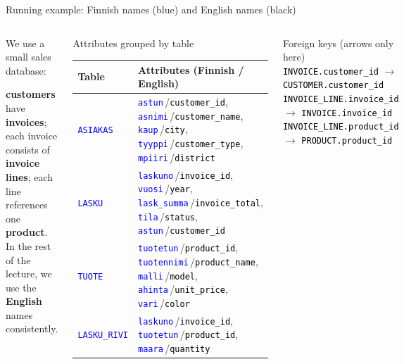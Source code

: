 \documentclass[10pt,aspectratio=169]{beamer}
\newcommand{\fin}[1]{\textcolor{blue}{\texttt{#1}}}
\newcommand{\eng}[1]{\textcolor{black}{\texttt{#1}}}
\begin{document}
\begin{frame}{Running example: Finnish names (blue) and English names (black)}
\small
\begin{columns}[T,onlytextwidth]


\begin{block}{We use a small sales database:}

\textbf{customers} have \textbf{invoices}; each invoice consists of \textbf{invoice lines}; each line references one \textbf{product}.\\
In the rest of the lecture, we use the \textbf{English} names consistently.
\end{block}

\vspace{5mm}
\begin{block}{Attributes grouped by table}
\scriptsize
\begin{tabular}{@{}l l@{}}
\toprule
\textbf{Table} & \textbf{Attributes (Finnish / English)}\\
\midrule
\fin{ASIAKAS} &
\fin{astun}\,/\eng{customer\_id},\;
\fin{asnimi}\,/\eng{customer\_name},\;
\fin{kaup}\,/\eng{city},\;
\fin{tyyppi}\,/\eng{customer\_type},\;
\fin{mpiiri}\,/\eng{district}\\
\addlinespace
\fin{LASKU} &
\fin{laskuno}\,/\eng{invoice\_id},\;
\fin{vuosi}\,/\eng{year},\;
\fin{lask\_summa}\,/\eng{invoice\_total},\;
\fin{tila}\,/\eng{status},\;
\fin{astun}\,/\eng{customer\_id}\\
\addlinespace
\fin{TUOTE} &
\fin{tuotetun}\,/\eng{product\_id},\;
\fin{tuotennimi}\,/\eng{product\_name},\;
\fin{malli}\,/\eng{model},\;
\fin{ahinta}\,/\eng{unit\_price},\;
\fin{vari}\,/\eng{color}\\
\addlinespace
\fin{LASKU\_RIVI} &
\fin{laskuno}\,/\eng{invoice\_id},\;
\fin{tuotetun}\,/\eng{product\_id},\;
\fin{maara}\,/\eng{quantity}\\
\bottomrule
\end{tabular}
\end{block}

\vspace{1mm}
\begin{block}{Foreign keys (arrows only here)}
\scriptsize
\eng{INVOICE.customer\_id} $\rightarrow$ \eng{CUSTOMER.customer\_id}\\
\eng{INVOICE\_LINE.invoice\_id} $\rightarrow$ \eng{INVOICE.invoice\_id}\\
\eng{INVOICE\_LINE.product\_id} $\rightarrow$ \eng{PRODUCT.product\_id}
\end{block}


\end{columns}
\end{frame}
\end{document}
